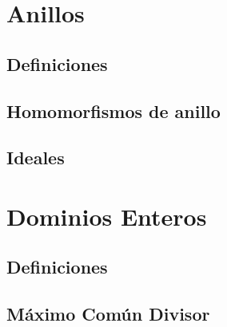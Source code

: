 \newpage
\section{Anillos}


    \subsection{Definiciones}



    \subsection{Homomorfismos de anillo}



    \subsection{Ideales}



\newpage
\section{Dominios Enteros}


    \subsection{Definiciones}



    \subsection{Máximo Común Divisor}

